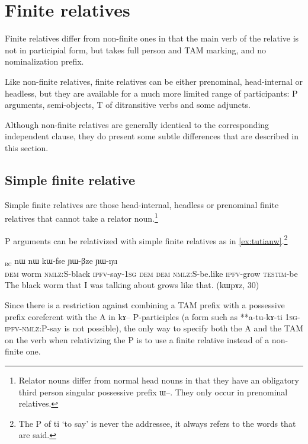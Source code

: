 \documentclass[oldfontcommands,oneside,a4paper,11pt]{article}
\newcommand{\ipa}[1]{{\phon #1}} %
\newcommand{\topic}{\textsc{dem}}
\newcommand{\tete}{\textsuperscript{\textsc{head}}}
\newcommand{\rc}{\textsubscript{\textsc{rc}}}
\begin{document}
\section{Finite relatives} \label{sec:finite}
Finite relatives differ from non-finite ones in that the main verb of the relative is not in participial form, but takes full person and TAM marking, and no nominalization prefix.

Like non-finite relatives, finite relatives can be either prenominal, head-internal or headless, but they are available for a much more limited range of participants: P arguments, semi-objects, T of ditransitive verbs and some adjuncts. 

Although non-finite relatives are generally identical to the corresponding independent clause, they do present some subtle differences that are described in this section.

\subsection{Simple finite relative} \label{sec:finite.P}
Simple finite relatives are those head-internal, headless or prenominal finite relatives that cannot take a  relator noun.\footnote{Relator nouns differ from normal head nouns in that they have an obligatory third person singular possessive prefix \ipa{ɯ--}. They only occur in prenominal relatives.}  

P arguments can be relativized with simple finite relatives as in \ref{ex:tutianw}.\footnote{The P of \ipa{ti} `to say' is never the addressee, it always refers to the words that are said.} 

     \begin{exe}
   \ex \label{ex:tutianw}
 \gll [\ipa{nɯ}  	\ipa{qajɯ}\tete{}  	\ipa{kɯ-ɲaʁ}  	\ipa{tu-ti-a}]\rc{}  	\ipa{nɯ}  	\ipa{nɯ}  	\ipa{kɯ-fse}  	\ipa{ɲɯ-βze}  	\ipa{ɲɯ-ŋu}  \\
\textsc{dem} worm \textsc{nmlz:S}-black \textsc{ipfv}-say-\textsc{1sg} \topic{} \textsc{dem} \textsc{nmlz:S}-be.like \textsc{ipfv}-grow \textsc{testim}-be \\
\glt The black worm that I was talking about grows like that. (kɯpɤz, 30)
\end{exe}

Since there is a restriction against combining a TAM prefix with a possessive prefix coreferent with the A in \ipa{kɤ--} P-participles (a form such as **\ipa{a-tu-kɤ-ti} \textsc{1sg-ipfv-nmlz:P}-say is not possible), the only way to specify both the A and the TAM on the verb when relativizing the P is to use a finite relative instead of a non-finite one.
\end{document}
